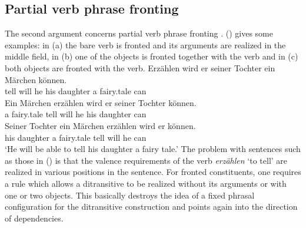 \documentclass[output=paper]{langsci/langscibook}
\begin{document}
\subsection{Partial verb phrase fronting}

The second argument concerns partial verb phrase fronting \citep[Section~5.5.2]{MuellerGT-Eng1}. 
() gives some examples: in (a) the bare verb is fronted and its arguments are realized
in the middle field, in (b) one of the objects is fronted together with the verb and in
(c) both objects are fronted with the verb.
\eal
\ex 
\gll Erzählen wird er seiner Tochter ein Märchen können.\\
     tell will he his daughter a fairy.tale can\\
\ex 
\gll Ein Märchen erzählen wird er seiner Tochter können.\\
     a fairy.tale tell will he his daughter can\\
\ex 
\gll Seiner Tochter ein Märchen erzählen wird er können.\\
     his daughter a fairy.tale tell will he can\\
\glt `He will be able to tell his daughter a fairy tale.'
\zl
The problem with sentences such as those in () is that the valence requirements of the verb
\emph{erzählen} `to tell' are realized in various positions in the sentence. For fronted
constituents, one requires a rule which allows a ditransitive to be realized without its arguments
or with one or two objects. This basically destroys the idea of a fixed phrasal configuration for
the ditransitive construction and points again into the direction of dependencies.
\end{document}
